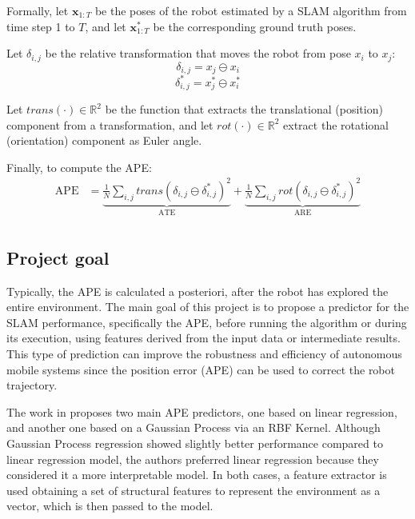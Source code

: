 Formally, let $\bm{x}_{1:T}$ be the poses of the robot estimated by
a SLAM algorithm from time step 1 to $T$, and let $\bm{x}^*_{1:T}$ be the corresponding ground truth poses.

Let $\delta_{i,j}$ be the relative transformation that moves the robot from pose $x_i$ to $x_j$:
$$ \delta_{i,j}=x_j\ominus x_i $$
$$ \delta^*_{i,j}=x^*_j\ominus x^*_i $$ 

Let $trans(\cdot)\in\mathbb{R}^2$ be the function that extracts the translational (position) component from a 
transformation, and let $rot(\cdot)\in\mathbb{R}^2$ extract the rotational (orientation) component as Euler angle.

Finally, to compute the APE: 
$$
\begin{aligned}
    \displaystyle
    \text{APE} &= \underbrace{\frac{1}{N}\sum_{i,j}trans(\delta_{i,j}\ominus\delta^*_{i,j})^2}_{\text{ATE}}+
                  \underbrace{\frac{1}{N}\sum_{i,j}rot(\delta_{i,j}\ominus\delta^*_{i,j})^2}_{\text{ARE}} \\
\end{aligned}
$$

\subsection{Project goal}
Typically, the APE is calculated a posteriori, after the robot has explored the entire environment. The main
goal of this project is to propose a predictor for the SLAM performance, specifically the APE, before running 
the algorithm or during its execution, using features derived from the input data or intermediate results.
This type of prediction can improve the robustness and efficiency of autonomous mobile systems since the 
position error (APE) can be used to correct the robot trajectory.

The work in \cite{Luperto} proposes two main APE predictors, one based on linear regression, and another one
based on a Gaussian Process via an RBF Kernel. Although Gaussian Process regression showed slightly better
performance compared to linear regression model, the authors preferred linear regression because they
considered it a more interpretable model. In both cases, a feature extractor is used \cite{Luperto2} obtaining
a set of structural features to represent the environment as a vector, which is then passed to the model.
